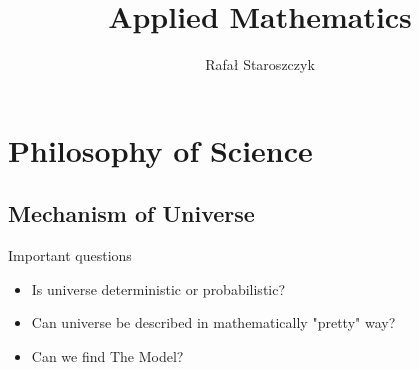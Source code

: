 \documentclass[xcolor]{beamer}
\title{Applied Mathematics}
\author{Rafał Staroszczyk}
\date{}
\begin{document}
\begin{frame}
\maketitle
\end{frame}

\begin{frame}
\tableofcontents
\end{frame}

\section{Philosophy of Science}
\subsection{Mechanism of Universe}

\begin{frame}{Important questions}
\begin{itemize}
\item Is universe deterministic or probabilistic?
\item Can universe be described in mathematically "pretty" way?
\item Can we find The Model?
\end{itemize}
\end{frame}
\end{document}
